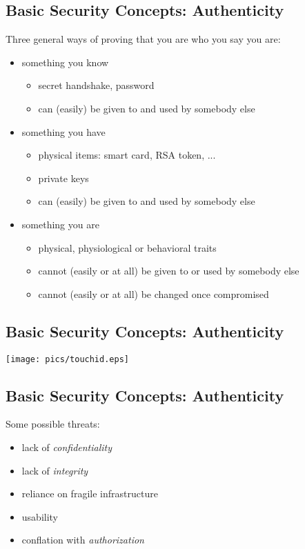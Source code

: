 \documentclass[xga]{xdvislides}
\begin{document}
\subsection{Basic Security Concepts: Authenticity}
Three general ways of proving that you are who you say you are:
\begin{itemize}
	\item something you know
		\begin{itemize}
			\item secret handshake, password
			\item can (easily) be given to and used by somebody else
		\end{itemize}
	\item something you have
		\begin{itemize}
			\item physical items: smart card, RSA token, ...
			\item private keys
			\item can (easily) be given to and used by somebody else
		\end{itemize}
	\item something you are
		\begin{itemize}
			\item physical, physiological or behavioral traits
			\item cannot (easily or at all) be given to or
				used by somebody else
			\item cannot (easily or at all) be changed once
				compromised
		\end{itemize}
\end{itemize}

\subsection{Basic Security Concepts: Authenticity}
\vfill
\begin{center}
	\texttt{[image: pics/touchid.eps]}
\end{center}
\vfill

\subsection{Basic Security Concepts: Authenticity}
Some possible threats:
\begin{itemize}
	\item lack of {\em confidentiality}
	\item lack of {\em integrity}
	\item reliance on fragile infrastructure
	\item usability
	\item conflation with {\em authorization}
\end{itemize}
\end{document}
